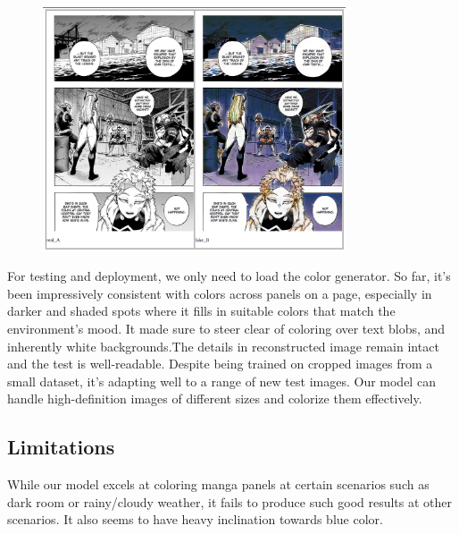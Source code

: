 \begin{figure}[h!]
  \centering
  \includegraphics[width=0.8\textwidth]{chapter/actual/acz.png}
  \label{fig:final UI}
\end{figure}

For testing and deployment, we only need to load the color generator. So far, it's been impressively consistent with colors across panels on a page, especially in darker and shaded spots where it fills in suitable colors that match the environment's mood. It made sure to steer clear of coloring over text blobs, and inherently white backgrounds.The details in reconstructed image remain intact and the test is well-readable. Despite being trained on cropped images from a small dataset, it's adapting well to a range of new test images. Our model can handle high-definition images of different sizes and colorize them effectively.
\clearpage
\subsection{Limitations}
While our model excels at coloring manga panels at certain scenarios such as dark room or rainy/cloudy weather, it fails to produce such good results at other scenarios. It also seems to have heavy inclination towards blue color. 

